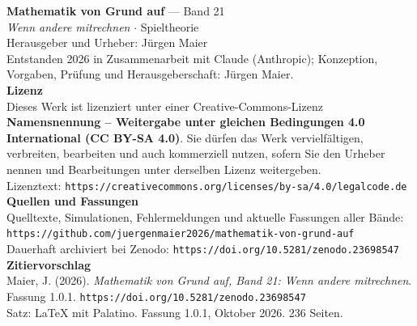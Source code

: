 \thispagestyle{empty}
\vspace*{\fill}
\begin{flushleft}
{\small\color{grau}
\textbf{\color{tief}Mathematik von Grund auf} --- Band 21\\[2pt]
\textit{Wenn andere mitrechnen} $\cdot$ Spieltheorie\\[14pt]

Herausgeber und Urheber: Jürgen Maier\\[2pt]
Entstanden 2026 in Zusammenarbeit mit Claude (Anthropic); Konzeption, Vorgaben, Prüfung und Herausgeberschaft: Jürgen Maier.\\[14pt]

\textbf{Lizenz}\\[2pt]
Dieses Werk ist lizenziert unter einer Creative-Commons-Lizenz \textbf{Namensnennung -- Weitergabe unter gleichen Bedingungen 4.0 International (CC BY-SA 4.0)}. Sie dürfen das Werk vervielfältigen, verbreiten, bearbeiten und auch kommerziell nutzen, sofern Sie den Urheber nennen und Bearbeitungen unter derselben Lizenz weitergeben.\\[2pt]
Lizenztext: \texttt{https://creativecommons.org/licenses/by-sa/4.0/legalcode.de}\\[14pt]

\textbf{Quellen und Fassungen}\\[2pt]
Quelltexte, Simulationen, Fehlermeldungen und aktuelle Fassungen aller Bände:\\
\texttt{https://github.com/juergenmaier2026/mathematik-von-grund-auf}\\[2pt]
Dauerhaft archiviert bei Zenodo: \texttt{https://doi.org/10.5281/zenodo.23698547}\\[14pt]

\textbf{Zitiervorschlag}\\[2pt]
Maier, J. (2026). \textit{Mathematik von Grund auf, Band 21: Wenn andere mitrechnen}. Fassung 1.0.1. \texttt{https://doi.org/10.5281/zenodo.23698547}\\[14pt]

Satz: \LaTeX{} mit Palatino. Fassung 1.0.1, Oktober 2026. 236 Seiten.
}
\end{flushleft}
\vspace*{1.5cm}
